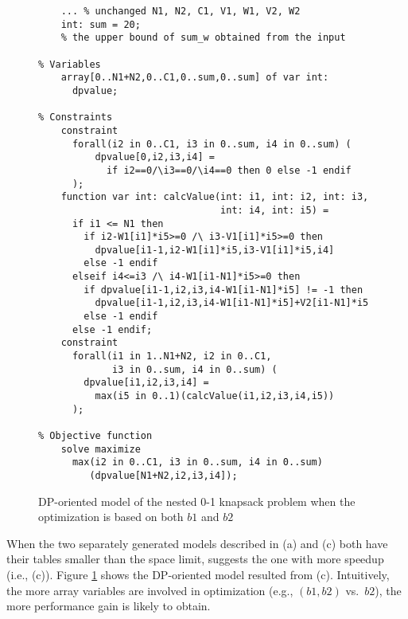  	\begin{figure}[htb]
\begin{lstlisting}[frame=single]
% Input arguments
    ... % unchanged N1, N2, C1, V1, W1, V2, W2
    int: sum = 20;
    % the upper bound of sum_w obtained from the input

% Variables
    array[0..N1+N2,0..C1,0..sum,0..sum] of var int:
      dpvalue;

% Constraints
    constraint
      forall(i2 in 0..C1, i3 in 0..sum, i4 in 0..sum) (
          dpvalue[0,i2,i3,i4] =
            if i2==0/\i3==0/\i4==0 then 0 else -1 endif
      );
    function var int: calcValue(int: i1, int: i2, int: i3,
                                int: i4, int: i5) =
      if i1 <= N1 then
        if i2-W1[i1]*i5>=0 /\ i3-V1[i1]*i5>=0 then
          dpvalue[i1-1,i2-W1[i1]*i5,i3-V1[i1]*i5,i4]
        else -1 endif
      elseif i4<=i3 /\ i4-W1[i1-N1]*i5>=0 then
        if dpvalue[i1-1,i2,i3,i4-W1[i1-N1]*i5] != -1 then
          dpvalue[i1-1,i2,i3,i4-W1[i1-N1]*i5]+V2[i1-N1]*i5
        else -1 endif
      else -1 endif;
    constraint
      forall(i1 in 1..N1+N2, i2 in 0..C1,
             i3 in 0..sum, i4 in 0..sum) (
        dpvalue[i1,i2,i3,i4] =
          max(i5 in 0..1)(calcValue(i1,i2,i3,i4,i5))
      );

% Objective function    
    solve maximize
      max(i2 in 0..C1, i3 in 0..sum, i4 in 0..sum)
         (dpvalue[N1+N2,i2,i3,i4]);
\end{lstlisting}
\caption{DP-oriented model of the nested 0-1 knapsack problem when
the optimization is based on both $b1$ and $b2$}\label{fig:knapsack4}
\end{figure}

 When the two separately generated models described in (a) and (c) both have their tables smaller than the space limit, \tool suggests the one with more speedup (i.e., (c)).
  Figure \ref{fig:knapsack4} shows the DP-oriented model resulted from (c).
  Intuitively, the more array variables are involved in optimization (e.g., $(b1, b2)$ vs.~$b2$), the more performance gain \tool is likely to obtain.  